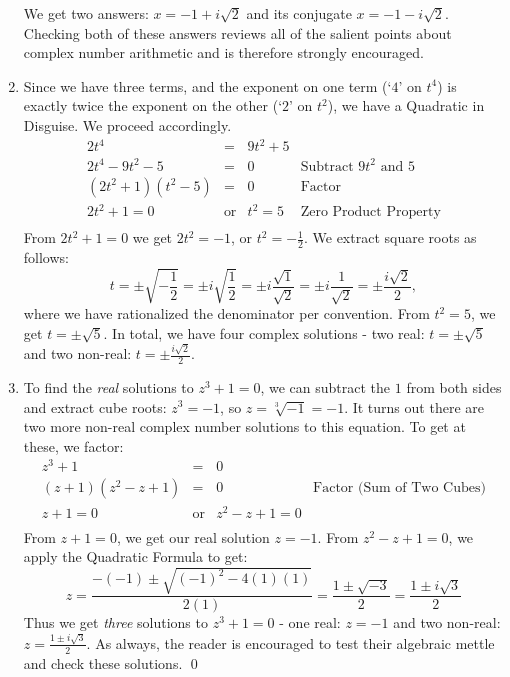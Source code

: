 \documentclass[10pt]{article}
\begin{document}
\begin{ex}
\begin{enumerate}
We get two answers: $x = -1 + i\sqrt{2}$ and its conjugate $x = -1 - i\sqrt{2}$.  Checking both of these answers reviews all of the salient points about complex number arithmetic and is therefore strongly encouraged.

\item  Since we have three terms, and the exponent on one term (`$4$' on $t^4$) is exactly twice the exponent on the other (`$2$' on $t^2$), we have a Quadratic in Disguise.  We proceed accordingly.\[ \begin{array}{rclr}

2t^4 & = & 9t^2 + 5 & \\

2t^4 - 9t^2 - 5 & = & 0 & \text{Subtract $9t^2$ and $5$} \\
(2t^2 + 1)(t^2 - 5) & = & 0 & \text{Factor} \\
2t^2 + 1 = 0 & \text{or} & t^2 = 5 & \text{Zero Product Property} \\
\end{array}\]  From $2t^2 + 1 = 0$ we get $2t^2 = -1$, or $t^2 = -\frac{1}{2}$.  We extract square roots as follows: \[ t = \pm \sqrt{-\dfrac{1}{2}} = \pm i \sqrt{\dfrac{1}{2}} = \pm i \dfrac{\sqrt{1}}{\sqrt{2}} = \pm i \dfrac{1}{\sqrt{2}} = \pm \dfrac{i \sqrt{2}}{2},\]
where we have rationalized the denominator per convention.  From $t^2 = 5$, we get $t = \pm \sqrt{5}$. In total, we have four complex solutions - two real: $t = \pm \sqrt{5}$ and two non-real: $t = \pm \frac{i \sqrt{2}}{2}$.

\item To find  the \textit{real} solutions to  $z^3 + 1 = 0$, we can subtract the $1$ from both sides and extract cube roots: $z^3 = -1$, so $z  = \sqrt[3]{-1} = -1$.  It turns out there are two more non-real complex number solutions to this equation.  To get at these, we factor:\[ \begin{array}{rclr}

z ^ 3 + 1 & = & 0 & \\
(z + 1)(z^2 - z + 1) & = & 0 & \text{Factor (Sum of Two Cubes)} \\
z + 1 = 0 & \text{or} & z^2 - z + 1 = 0 & \\
\end{array} \] From $z+1 = 0$, we get our real solution $z = -1$.  From $z^2 -z + 1 = 0$, we apply the Quadratic Formula to get: \[z = \dfrac{-(-1) \pm \sqrt{(-1)^2 - 4(1)(1)}}{2(1)} = \dfrac{1 \pm \sqrt{-3}}{2} = \dfrac{1 \pm i\sqrt{3}}{2} \]
Thus we get \textit{three} solutions to $z^3 + 1 = 0$ - one real: $z = -1$ and two non-real: $z =  \frac{1 \pm i\sqrt{3}}{2}$.  As always, the reader is encouraged to test their algebraic mettle and check these solutions. \qed
		
\end{enumerate}


\end{ex}
\end{document}
